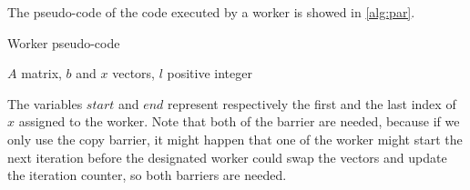 \documentclass[12pt]{article}
\begin{document}
	The pseudo-code of the code executed by a worker is showed in \ref{alg:par}.
	\begin{algorithm}[H]
		\caption{Worker pseudo-code}\label{alg:par}
		\begin{algorithmic}[1]
			\Require $A$ matrix, $b$ and $x$ vectors, $l$ positive integer
			\EndIf
			\EndFor
			\EndFor
			\EndIf
			\EndWhile
		\end{algorithmic}
	\end{algorithm}
	\noindent The variables $start$ and $end$ represent respectively the first and the last index of $x$ assigned to the worker. Note that both of the barrier are needed, because if we only use the copy barrier, it might happen that one of the worker might start the next iteration before the designated worker could swap the vectors and update the iteration counter, so both barriers are needed. 
	
	
\end{document}
